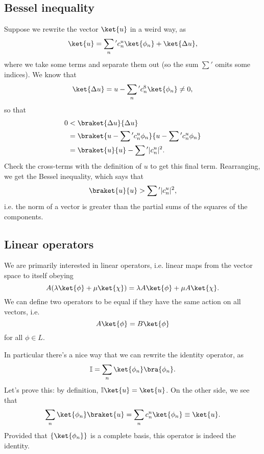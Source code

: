 \subsection*{Bessel inequality}
Suppose we rewrite the vector $\ket{u}$ in a weird way, as
\begin{equation}
    \ket{u} = \sum_n{}' c_n^u \ket{\phi_n} + \ket{\Delta u},
\end{equation}
where we take some terms and separate them out (so the sum $\sum{}'$ omits some indices). We know that
\begin{equation}
    \ket{\Delta u} = u-\sum_n{}' c_n^8 \ket{\phi_n} \neq 0,
\end{equation}
so that
\begin{align}
     0 &< \braket{\Delta u}{\Delta u}\\
        &= \braket{u-\sum{}' c_n^u \phi_n}{u-\sum{}' c_n^u \phi_n}\\
        &= \braket{u}{u}-\sum{}'|c_n^u|^2.
\end{align}
Check the cross-terms with the definition of $u$ to get this final term. Rearranging, we get the Bessel inequality, which says that
\begin{equation}
    \braket{u}{u} > \sum{}' |c_n^u|^2,
\end{equation}
i.e. the norm of a vector is greater than the partial sums of the squares of the components.

\subsection*{Linear operators}
We are primarily interested in linear operators, i.e. linear maps from the vector space to itself obeying
\begin{equation}
    A(\lambda\ket{\phi}+\mu\ket{\chi}) = \lambda A\ket{\phi} +\mu A \ket{\chi}.
\end{equation}
We can define two operators to be equal if they have the same action on all vectors, i.e.
\begin{equation}
    A\ket{\phi}=B\ket{\phi}
\end{equation}
for all $\phi\in L$.

In particular there's a nice way that we can rewrite the identity operator, as
\begin{equation}
    \mathbb{I}=\sum_n \ket{\phi_n}\bra{\phi_n}.
\end{equation}
Let's prove this: by definition, $\mathbb{I}\ket{u}=\ket{u}$. On the other side, we see that
\begin{equation}
     \sum_n \ket{\phi_n}\braket{u} = \sum_n c_n^u \ket{\phi_n} \equiv \ket{u}.
\end{equation}
Provided that $\set{\ket{\phi_n}}$ is a complete basis, this operator is indeed the identity.

